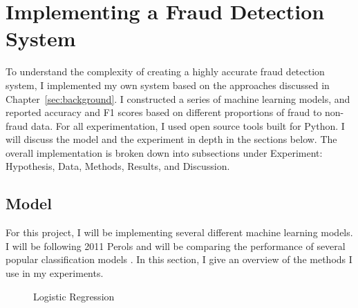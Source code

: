 \documentclass[midd]{thesis}
\begin{document}
\pagebreak
\chapter{Implementing a Fraud Detection System}
\label{sec:impl}


To understand the complexity of creating a highly accurate fraud detection system, I implemented my own system based on the approaches discussed in Chapter~\ref{sec:background}. I constructed a series of machine learning models, and reported accuracy and F1 scores based on different proportions of fraud to non-fraud data. For all experimentation, I used open source tools built for Python. I will discuss the model and the experiment in depth in the sections below. The overall implementation is broken down into subsections under Experiment: Hypothesis, Data, Methods, Results, and Discussion. 

\section{Model} 

For this project, I will be implementing several different machine learning models. I will be following 2011 Perols and will be comparing the performance of several popular classification models \cite{Perols2011}. In this section, I give an overview of the methods I use in my experiments.



\begin{figure}

\caption{Logistic Regression}
\label{fig:lr}
\end{figure}
\end{document}
